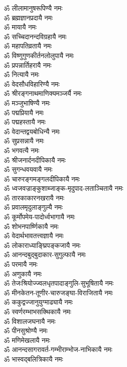 \begin{multicols}{2}
\begin{flushleft}
ॐ लीलामानुषरूपिण्यै नमः\\
ॐ ब्रह्मज्ञानप्रदायै नमः\\
ॐ मायायै नमः\hfill{}\\
ॐ सच्चिदानन्दविग्रहायै नमः\\
ॐ महापतिव्रतायै नमः\\
ॐ विष्णुगुणकीर्तनलोलुपायै नमः\\
ॐ प्रपन्नार्तिहरायै नमः\\
ॐ नित्यायै नमः\\
ॐ वेदसौधविहारिण्यै नमः\\
ॐ श्रीरङ्गनाथमाणिक्यमञ्जर्यै नमः\\
ॐ मञ्जुभाषिण्यै नमः\\
ॐ पद्मप्रियायै नमः\\
ॐ पद्महस्तायै नमः\hfill{}\\
ॐ वेदान्तद्वयबोधिन्यै नमः\\
ॐ सुप्रसन्नायै नमः\\
ॐ भगवत्यै नमः\\
ॐ श्रीजनार्दनदीपिकायै नमः\\
ॐ सुगन्धवयवायै नमः\\
ॐ चारुरङ्गमङ्गलदीपिकायै नमः\\
ॐ ध्वजवज्राङ्कुशाब्जाङ्क-मृदुपाद-लताञ्चितायै नमः\\
ॐ तारकाकारनखरायै नमः\\
ॐ प्रवालमृदुलाङ्गुल्यै नमः\\
ॐ कूर्मोपमेय-पादोर्ध्वभागायै नमः\hfill{}\\
ॐ शोभनपार्ष्णिकायै नमः\\
ॐ वेदार्थभावतत्त्वज्ञायै नमः\\
ॐ लोकाराध्याङ्घ्रिपङ्कजायै नमः\\
ॐ आनन्दबुद्बुदाकार-सुगुल्फायै नमः\\
ॐ परमायै नमः\\
ॐ अणुकायै नमः\\
ॐ तेजःश्रियोज्ज्वलधृतपादाङ्गुलि-सुभूषितायै नमः\\
ॐ मीनकेतन-तूणीर-चारुजङ्घा-विराजितायै नमः\\
ॐ ककुद्वज्जानुयुग्माढ्यायै नमः\\
ॐ स्वर्णरम्भाभसक्थिकायै नमः\hfill{}\\
ॐ विशालजघनायै नमः\\
ॐ पीनसुश्रोण्यै नमः\\
ॐ मणिमेखलायै नमः\\
ॐ आनन्दसागरावर्त-गम्भीराम्भोज-नाभिकायै नमः\\
ॐ भास्वद्बलित्रिकायै नमः\\

\end{flushleft}
\end{multicols}
